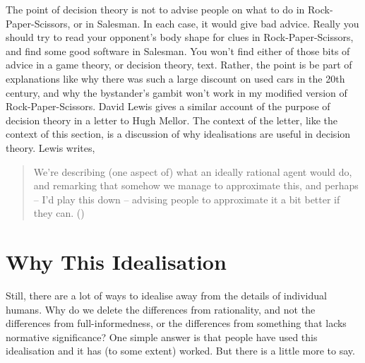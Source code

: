 \documentclass[
  12pt,
  letterpaper,
  DIV=11,
  numbers=noendperiod]{scrreprt}
\begin{document}
The point of decision theory is not to advise people on what to do in
Rock-Paper-Scissors, or in Salesman. In each case, it would give bad
advice. Really you should try to read your opponent's body shape for
clues in Rock-Paper-Scissors, and find some good software in Salesman.
You won't find either of those bits of advice in a game theory, or
decision theory, text. Rather, the point is be part of explanations like
why there was such a large discount on used cars in the 20th century,
and why the bystander's gambit won't work in my modified version of
Rock-Paper-Scissors. David Lewis gives a similar account of the purpose
of decision theory in a letter to Hugh Mellor. The context of the
letter, like the context of this section, is a discussion of why
idealisations are useful in decision theory. Lewis writes,

\begin{quote}
We're describing (one aspect of) what an ideally rational agent would
do, and remarking that somehow we manage to approximate this, and
perhaps -- I'd play this down -- advising people to approximate it a bit
better if they can. ()
\end{quote}

\section{Why This Idealisation}\label{sec-why-this-ideal}

Still, there are a lot of ways to idealise away from the details of
individual humans. Why do we delete the differences from rationality,
and not the differences from full-informedness, or the differences from
something that lacks normative significance? One simple answer is that
people have used this idealisation and it has (to some extent) worked.
But there is a little more to say.
\end{document}
